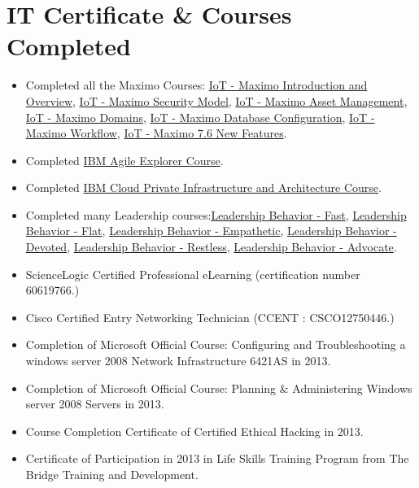 \documentclass[letterpaper, 12 pt]{article}
\begin{document}
		\section{IT Certificate \& Courses Completed}
			\begin{itemize}[noitemsep]
				\item {Completed all the Maximo Courses: \href{https://www.credly.com/badges/63308385-9f62-46dd-bcf4-7ae85141417f/public_url}{IoT - Maximo Introduction and Overview}, \href{https://www.credly.com/badges/b30f2751-e9e7-48d7-a2b5-05554d597b8a/public_url}{IoT - Maximo Security Model}, \href{https://www.credly.com/badges/83f47a44-e89e-4e09-a9d1-18c5e1962e2a/public_url}{IoT - Maximo Asset Management}, \href{https://www.credly.com/badges/d5e89db9-447e-40d0-b15c-430ecd9a0820/public_url}{IoT - Maximo Domains}, \href{https://www.credly.com/badges/b3788bc2-5080-4e01-a80c-de9fd194956f/public_url}{IoT - Maximo Database Configuration}, \href{https://www.credly.com/badges/cad42cb1-bfc4-41da-9f38-25278f68f5a7/public_url}{IoT - Maximo Workflow}, \href{https://www.credly.com/badges/7a6d6602-a0ae-4cd7-8e84-f5982149b181/public_url}{IoT - Maximo 7.6 New Features}.} 
				\item {Completed \href{https://www.credly.com/badges/94135bf2-5cd9-4cfe-b940-723479544e3f/public_url}{IBM Agile Explorer Course}.} 
				\item {Completed \href{https://www.credly.com/badges/0259d635-d864-4236-8872-a44eea7ab29c/public_url}{IBM Cloud Private Infrastructure and Architecture Course}.} 
				\item {Completed many Leadership courses:\href{https://www.credly.com/badges/af521083-272b-4373-bf01-cf65bbf0251d/public_url}{Leadership Behavior - Fast}, \href{https://www.credly.com/badges/e478b3ff-6f6e-4350-89f9-f3822a450df3/public_url}{Leadership Behavior - Flat}, \href{https://www.credly.com/badges/afa9f307-dce4-48c5-9a2b-24dc7831d602/public_url}{Leadership Behavior - Empathetic}, \href{https://www.credly.com/badges/bbac771c-7f96-4bb6-b89a-8a7f89ba070a/public_url}{Leadership Behavior - Devoted}, \href{https://www.credly.com/badges/0eb16b26-7eba-440e-b657-f8e9715af76c/public_url}{Leadership Behavior - Restless}, \href{https://www.credly.com/badges/899c9aed-17a5-4eca-a8b0-1e132c289225/public_url}{Leadership Behavior - Advocate}.}
				\item {ScienceLogic Certified Professional eLearning (certification number 60619766.)} 
				\item {Cisco Certified Entry Networking Technician (CCENT : CSCO12750446.)} 
				\item {Completion of Microsoft Official Course: Configuring and Troubleshooting a windows server 2008 Network Infrastructure 6421AS in 2013.} 
				\item {Completion of Microsoft Official Course: Planning \& Administering Windows server 2008 Servers in 2013.}
				\item {Course Completion Certificate of Certified Ethical Hacking in 2013.}
				\item {Certificate of Participation in 2013 in Life Skills Training Program from The Bridge Training and Development.}
			\end{itemize}
		
\end{document}
